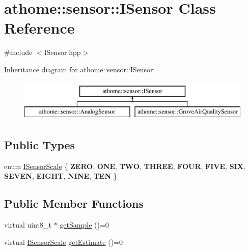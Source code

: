 \hypertarget{classathome_1_1sensor_1_1_i_sensor}{}\section{athome\+:\+:sensor\+:\+:I\+Sensor Class Reference}
\label{classathome_1_1sensor_1_1_i_sensor}


{\ttfamily \#include $<$I\+Sensor.\+hpp$>$}

Inheritance diagram for athome\+:\+:sensor\+:\+:I\+Sensor\+:\begin{figure}[H]
\begin{center}
\leavevmode
\includegraphics[height=2.000000cm]{classathome_1_1sensor_1_1_i_sensor}
\end{center}
\end{figure}
\subsection*{Public Types}
\begin{DoxyCompactItemize}
\item 
enum \mbox{\hyperlink{classathome_1_1sensor_1_1_i_sensor_aa70bc27a4c17c86caf96cca776541ddf}{I\+Sensor\+Scale}} \{ \newline
{\bfseries Z\+E\+RO}, 
{\bfseries O\+NE}, 
{\bfseries T\+WO}, 
{\bfseries T\+H\+R\+EE}, 
\newline
{\bfseries F\+O\+UR}, 
{\bfseries F\+I\+VE}, 
{\bfseries S\+IX}, 
{\bfseries S\+E\+V\+EN}, 
\newline
{\bfseries E\+I\+G\+HT}, 
{\bfseries N\+I\+NE}, 
{\bfseries T\+EN}
 \}
\end{DoxyCompactItemize}
\subsection*{Public Member Functions}
\begin{DoxyCompactItemize}
\item 
virtual uint8\+\_\+t $\ast$ \mbox{\hyperlink{classathome_1_1sensor_1_1_i_sensor_a2513fd8acc5d8251439330ca0e78cf04}{get\+Sample}} ()=0
\item 
virtual \mbox{\hyperlink{classathome_1_1sensor_1_1_i_sensor_aa70bc27a4c17c86caf96cca776541ddf}{I\+Sensor\+Scale}} \mbox{\hyperlink{classathome_1_1sensor_1_1_i_sensor_a95785b54ffe3a8f7e48c81b5732e3b9f}{get\+Estimate}} ()=0
\end{DoxyCompactItemize}


